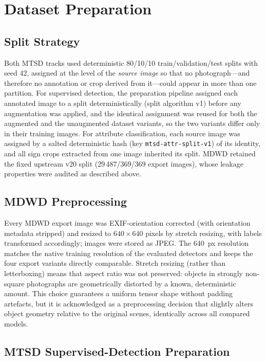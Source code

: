 \section{Dataset Preparation}
\label{sec:dataset-preparation}

\subsection{Split Strategy}

Both MTSD tracks used deterministic 80/10/10 train/validation/test splits with seed 42, assigned at the level of the \emph{source image} so that no photograph---and therefore no annotation or crop derived from it---could appear in more than one partition. For supervised detection, the preparation pipeline assigned each annotated image to a split deterministically (split algorithm v1) before any augmentation was applied, and the identical assignment was reused for both the augmented and the unaugmented dataset variants, so the two variants differ only in their training images. For attribute classification, each source image was assigned by a salted deterministic hash (key \texttt{mtsd-attr-split-v1}) of its identity, and all sign crops extracted from one image inherited its split. MDWD retained the fixed upstream v20 split (29\,487/369/369 export images), whose leakage properties were audited as described above.

\subsection{MDWD Preprocessing}

Every MDWD export image was EXIF-orientation corrected (with orientation metadata stripped) and resized to $640 \times 640$ pixels by stretch resizing, with labels transformed accordingly; images were stored as JPEG. The 640~px resolution matches the native training resolution of the evaluated detectors and keeps the four export variants directly comparable. Stretch resizing (rather than letterboxing) means that aspect ratio was not preserved: objects in strongly non-square photographs are geometrically distorted by a known, deterministic amount. This choice guarantees a uniform tensor shape without padding artefacts, but it is acknowledged as a preprocessing decision that slightly alters object geometry relative to the original scenes, identically across all compared models.

\subsection{MTSD Supervised-Detection Preparation}

